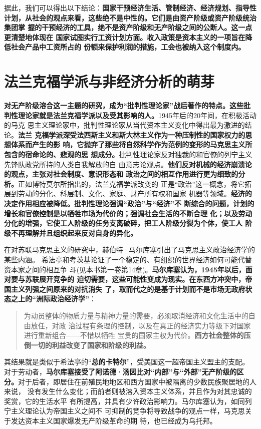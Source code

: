 据此，我们可以得出以下结论：\textbf{国家干预经济生活、管制经济、经济规划、指导性
  计划，从社会的观点来看，这些绝不是中性的。它们是由资产阶级或资产阶级统治集团掌
  握的干预经济的工具，绝不是资产阶级和无产阶级之间的公断人。这一点更清楚地体现在
  国家试图实行工资计划方面。收入政策是资本主义的一项旨在降低社会产品中工资所占的
  份额来保护利润的措施，工会也被纳入这个制度内。}

\section{法兰克福学派与非经济分析的萌芽}
\textbf{对无产阶级溶合这一主题的研究，成为“批判性理论家”战后著作的特点。这些批
  判性理论家就是法兰克福学派以及受其影响的人。}1945年后的20年间，在积极活动的马克
思主义理论家中，批判性理论家从当代资本主义变化中得出最为激进的结论。\textbf{法兰
  克福学派深受法西斯主义和斯大林主义作为一种压制性的国家权力的思想体系而产生的影
  响，它抛弃了那些将自然科学作为范例的变形的马克思主义所包含的宿命论的、悲观的思
  想成分。}批判性理论家反对独裁的和官僚的列宁主义先锋队政党所持的人类自我解放的自
由意志论观点。\textbf{他们反对机械的经济崩溃论的观点，主张对社会制度、意识形态和
  政治之间的相互作用进行更为细致的分析。}正如博特莫尔所指出的，法兰克福学派改变的
正是“政治”这一概念，将它拓展到劳动的分化、科层制、文化、家庭、财产所有权和国家
机器等领域。\textbf{经济的决定作用相应被降低。批判性理论强调“政治”与“经济”不
  断综合的问题，计划的增长和官僚控制是以牺牲市场为代价的；强调社会生活的不断合理
  化；以及劳动分化的增强，它使工人阶级的任务支离破碎，把工人阶级分裂为个体，使工人
  阶级不再理解并且组织起来反对自身的异化。}

在对苏联马克思主义的研究中，赫伯特·马尔库塞引出了马克思主义政治经济学的某些内涵。
希法亭和考茨基论证了一个稳定的、有组织的世界经济如何可能代替资本家之间的相互争
斗(见本书第一卷第14章)。\textbf{马尔库塞认为，1945年以后，面对要与苏联展开竞争的
  迫切需要，这些可能性变成为现实。在东西方冲突中，帝国主义列强之间原来的对抗消失
  了，取而代之的是基于计划而不是市场无政府状态之上的“洲际政治经济学”}：

\begin{quotation}
  为动员整体的物质力量与精神力量的需要，必须取消经济和文化生活中的自由放任，对政
  治过程有条理的控制，以及在真正的经济实力等级下对国家进行重新组合——不惜以牺牲
  宝贵的国家主权为代价。\textbf{西方社会整体的压倒一切的利益改变了国家和阶级的利益。}
\end{quotation}

其结果就是类似于希法亭的“\textbf{总的卡特尔}”，受美国这一超帝国主义盟主的支配。
对于劳动者，\textbf{马尔库塞接受了阿诺德·汤因比对“内部”与“外部”无产阶级的区
  分。}对于后者，即居住在前殖民地地区和西方国家中被隔离的少数民族聚居地的人来说，
没有发生什么变化；而前者则被溶入资本主义体系，并且作为对其忠诚的奖赏，它的生活水平
有所提高，并具有少许政治影响力。马尔库塞认为，如同列宁主义理论认为帝国主义之间不
可抑制的竞争将导致战争的观点一样，马克思关于发达资本主义国家爆发无产阶级革命的期
待，也已经成为乌托邦。

